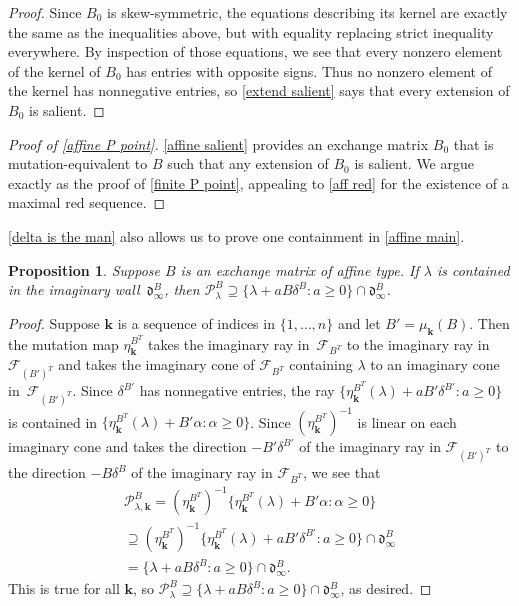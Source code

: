 \documentclass{amsart}
\newtheorem{proposition}{Proposition}[section]
\theoremstyle{definition}
\theoremstyle{remark}
\numberwithin{equation}{section}
\newcommand{\set}[1]{{\lbrace #1 \rbrace}}
\newcommand{\F}{{\mathcal F}}
\newcommand{\0}{{\mathbf{0}}}
\newcommand{\kk}{{\boldsymbol{k}}}
\renewcommand{\P}{\mathcal{P}}
\renewcommand{\d}{{\mathfrak d}}
\begin{document}
\begin{proof}
Since $B_0$ is skew-symmetric, the equations describing its kernel are exactly the same as the inequalities above, but with equality replacing strict inequality everywhere.
By inspection of those equations, we see that every nonzero element of the kernel of $B_0$ has entries with opposite signs.
Thus no nonzero element of the kernel has nonnegative entries, so \cref{extend salient} says that every extension of $B_0$ is salient.
\end{proof}

\begin{proof}[Proof of \cref{affine P point}]
\cref{affine salient} provides an exchange matrix $B_0$ that is mutation-equivalent to $B$ such that any extension of $B_0$ is salient.
We argue exactly as the proof of \cref{finite P point}, appealing to \cref{aff red} for the existence of a maximal red sequence.
\end{proof}

\cref{delta is the man} also allows us to prove one containment in \cref{affine main}.

\begin{proposition}\label{affine main partial}
Suppose $B$ is an exchange matrix of affine type.
If $\lambda$ is contained in the imaginary wall~$\d^B_\infty$, then $\P^B_\lambda\supseteq\set{\lambda+aB\delta^B:a\ge0}\cap\d^B_\infty$.  %
\end{proposition}
\begin{proof}
Suppose $\kk$ is a sequence of indices in $\set{1,\ldots,n}$ and let $B'=\mu_\kk(B)$.
Then the mutation map $\eta^{B^T}_\kk$ takes the imaginary ray in~$\F_{B^T}$ to the imaginary ray in~$\F_{(B')^T}$ and takes the imaginary cone of $\F_{B^T}$ containing $\lambda$ to an imaginary cone in~$\F_{(B')^T}$.
Since $\delta^{B'}$ has nonnegative entries, the ray $\set{\eta^{B^T}_\kk(\lambda)+aB'\delta^{B'}:a\ge0}$ is contained in $\set{\eta^{B^T}_\kk(\lambda)+B'\alpha:\alpha\ge0}$.
Since $(\eta_\kk^{B^T})^{-1}$ is linear on each imaginary cone and takes the direction $-B'\delta^{B'}$ of the imaginary ray in $\F_{(B')^T}$ to the direction $-B\delta^B$ of the imaginary ray in $\F_{B^T}$, we see that 
\begin{multline*}
\P^B_{\lambda,\kk}=(\eta_\kk^{B^T})^{-1}\set{\eta^{B^T}_\kk(\lambda)+B'\alpha:\alpha\ge0}\\
\supseteq(\eta_\kk^{B^T})^{-1}\set{\eta^{B^T}_\kk(\lambda)+aB'\delta^{B'}:a\ge0}\cap\d^B_\infty\\
=\set{\lambda+aB\delta^B:a\ge0}\cap\d^B_\infty. 
\end{multline*}
This is true for all $\kk$, so $\P^B_\lambda\supseteq\set{\lambda+aB\delta^B:a\ge0}\cap\d^B_\infty$, as desired.
\end{proof}
\end{document}
